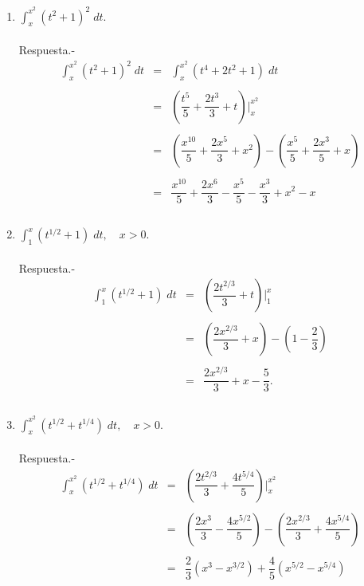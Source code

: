 \begin{enumerate}[\bfseries  1.]
    \item $\displaystyle\int_x^{x^2} (t^2+1)^2\; dt.$\\\\
	Respuesta.-\; $$\begin{array}{rcl}
	    \displaystyle\int_x^{x^2}(t^2+1)^2\; dt&=&\displaystyle\int_x^{x^2}(t^4+2t^2+1)\; dt\\\\
						   &=&\left(\dfrac{t^5}{5}+\dfrac{2t^3}{3}+t\right)\bigg|_x^{x^2}\\\\
						   &=&\left(\dfrac{x^10}{5}+\dfrac{2x^5}{3}+x^2\right)-\left(\dfrac{x^5}{5}+\dfrac{2x^3}{5}+x\right)\\\\
						   &=&\dfrac{x^{10}}{5}+\dfrac{2x^6}{3}-\dfrac{x^5}{5}-\dfrac{x^3}{3}+x^2-x\\\\
	\end{array}$$

    \item $\displaystyle\int_1^x (t^{1/2}+1)\; dt, \quad x>0.$\\\\
	Respuesta.-\; 
	$$\begin{array}{rcl}
	    \displaystyle\int_1^x (t^{1/2}+1)\; dt&=&\left(\dfrac{2t^{2/3}}{3}+t\right)\bigg|_1^x\\\\
						  &=&\left(\dfrac{2x^{2/3}}{3}+x\right)-\left(1-\dfrac{2}{3}\right)\\\\
						  &=&\dfrac{2x^{2/3}}{3}+x-\dfrac{5}{3}.\\\\
						  
	\end{array}$$

    \item $\displaystyle\int_x^{x^2} (t^{1/2} + t^{1/4})\; dt, \quad x>0$.\\\\
	Respuesta.-\;
	$$\begin{array}{rcl}
	    \displaystyle\int_x^{x^2} (t^{1/2} + t^{1/4})\; dt&=&\left(\dfrac{2t^{2/3}}{3}+\dfrac{4t^{5/4}}{5}\right)\bigg|_x^{x^2}\\\\
							      &=&\left(\dfrac{2x^3}{3}-\dfrac{4x^{5/2}}{5}\right)-\left(\dfrac{2x^{2/3}}{3}+\dfrac{4x^{5/4}}{5}\right)\\\\
							      &=&\dfrac{2}{3}(x^3-x^{3/2})+\dfrac{4}{5}(x^{5/2}-x^{5/4})\\\\
	\end{array}$$


\end{enumerate}
